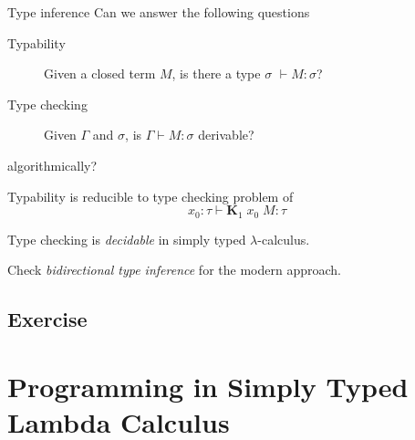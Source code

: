 \begin{frame}{Type inference}
  Can we answer the following questions
  \begin{description}
    \item[Typability] Given a closed term $M$, is there a type $\sigma$ $\vdash M : \sigma$? 
    \item[Type checking] Given $\Gamma$ and $\sigma$, is $\Gamma \vdash M : \sigma$ derivable?
  \end{description}
  algorithmically?
  
  Typability is reducible to type checking problem of
  \[
    x_0: \tau \vdash \textbf{K}_1\;x_0\;M : \tau
  \]

  \begin{theorem}
    Type checking is \emph{decidable}
    in simply typed $\lambda$-calculus.
  \end{theorem}

Check \emph{bidirectional type inference} for the modern approach.
\subsection*{Exercise}
  
\end{frame}

\section{Programming in Simply Typed Lambda Calculus}

